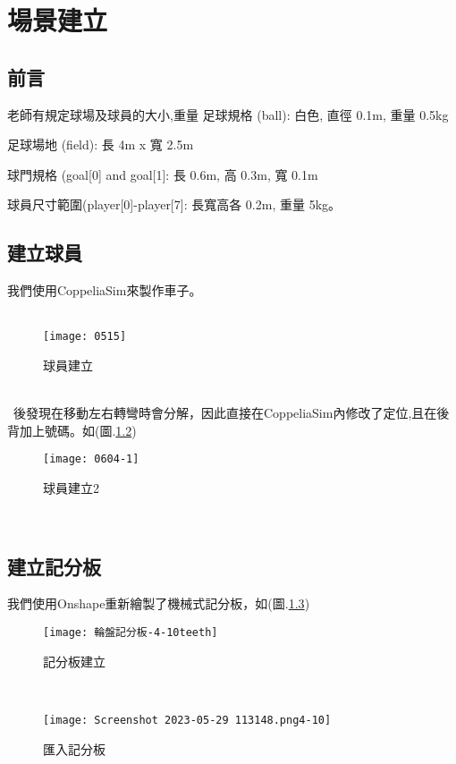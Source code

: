 \chapter{場景建立}
\section{前言}
老師有規定球場及球員的大小,重量
足球規格 (ball): 白色, 直徑 0.1m, 重量 0.5kg

足球場地 (field): 長 4m x 寬 2.5m

球門規格 (goal[0] and goal[1]: 長 0.6m, 高 0.3m, 寬 0.1m

球員尺寸範圍(player[0]-player[7]: 長寬高各 0.2m, 重量 5kg。\\
\section{建立球員}
我們使用CoppeliaSim來製作車子。\\
\
\begin{figure}[hbt!]
\begin{center}
\texttt{[image: 0515]}
\caption{\Large 球員建立}\label{球員建立}
\end{center}
\end{figure}
\\
\
後發現在移動左右轉彎時會分解，因此直接在CoppeliaSim內修改了定位,且在後背加上號碼。如(圖.\ref{球員建立2})\\

\begin{figure}[hbt!]
\begin{center}
\texttt{[image: 0604-1]}
\caption{\Large 球員建立2}\label{球員建立2}
\end{center}
\end{figure}\
\section{建立記分板}
我們使用Onshape重新繪製了機械式記分板，如(圖.\ref{記分板建立})\\
\begin{figure}[hbt!]
\begin{center}
\texttt{[image: 輪盤記分板-4-10teeth]}
\caption{\Large 記分板建立}\label{記分板建立}
\end{center}
\end{figure}\
\begin{figure}[hbt!]
\begin{center}
\texttt{[image: Screenshot 2023-05-29 113148.png4-10]}
\caption{\Large 匯入記分板}\label{匯入記分板}
\end{center}
\end{figure}\
\newpage
